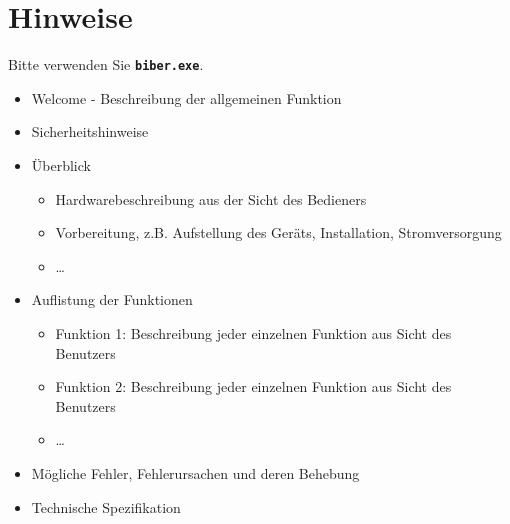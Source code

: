 %
%
%



\chapter{Hinweise}

Bitte verwenden Sie  \textbf{\texttt{biber.exe}}.



\bigskip

\begin{itemize}
  \item Welcome - Beschreibung der allgemeinen Funktion
  \item Sicherheitshinweise
  \item Überblick
    \begin{itemize}
      \item Hardwarebeschreibung aus der Sicht des  Bedieners
      \item Vorbereitung, z.B. Aufstellung des Geräts, Installation, Stromversorgung
      \item \ldots
    \end{itemize}
  \item Auflistung der Funktionen
    \begin{itemize}
    	\item Funktion 1: Beschreibung jeder einzelnen Funktion aus Sicht des Benutzers
    	\item Funktion 2: Beschreibung jeder einzelnen Funktion aus Sicht des Benutzers
    	\item \ldots
    \end{itemize}
  \item Mögliche Fehler, Fehlerursachen und deren Behebung
  \item Technische Spezifikation
\end{itemize}
